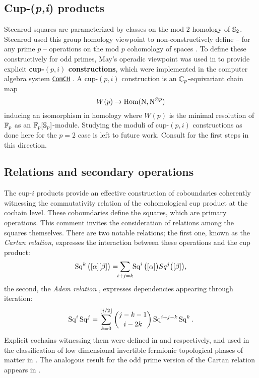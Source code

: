 \subsection{Cup-(\textit{p,i}) products}

Steenrod squares are parameterized by classes on the mod $2$ homology of $\mathbb{S}_2$.
Steenrod used this group homology viewpoint to non-constructively define -- for any prime $p$ -- operations on the mod $p$ cohomology of spaces \cite{steenrod1952reduced, steenrod1953cyclic}.
To define these constructively for odd primes, May's operadic viewpoint \cite{may1970general} was used in \cite{medina2021may_st} to provide explicit \textbf{cup-$(p,i)$ constructions}, which were implemented in the computer algebra system \href{https://github.com/ammedmar/comch}{\texttt{ComCH}} \cite{medina2021comch}.
A \mbox{cup-$(p,i)$} construction is an $\mathbb{C}_p$-equivariant chain map
\[
W(p) \to \mathrm{Hom}(\operatorname{N}, \operatorname{N}^{\otimes p})
\]
inducing an isomorphism in homology where $W(p)$
is the minimal resolution of ${\mathbb{F}_p}$ as an ${\mathbb{F}_p}[\mathbb{S}_p]$-module.
Studying the moduli of cup-$(p,i)$ constructions as done here for the $p = 2$ case is left to future work.
Consult \cite{medina2024connected} for the first steps in this direction.

\subsection{Relations and secondary operations}

The cup-$i$ products provide an effective construction of coboundaries coherently witnessing the commutativity relation of the cohomological cup product at the cochain level.
These coboundaries define the squares, which are primary operations.
This comment invites the consideration of relations among the squares themselves.
There are two notable relations;
the first one, known as the \textit{Cartan relation}, expresses the interaction between these operations and the cup product:
\begin{equation*}
	\Sq^k \big( [\alpha] [\beta] \big) =
	\sum_{\mathclap{i+j=k}} \, \Sq^i\big([\alpha]\big) Sq^j\big([\beta]\big),
\end{equation*}
the second, the \textit{Adem relation} \cite{adem1952iteration}, expresses dependencies appearing through iteration:
\begin{equation*}
	\operatorname{Sq}^i \operatorname{Sq}^j =
	\sum_{k=0}^{\lfloor i/2 \rfloor} \binom{j-k-1}{i-2k} \operatorname{Sq}^{i+j-k} \operatorname{Sq}^k.
\end{equation*}
Explicit cochains witnessing them were defined in \cite{medina2020cartan} and \cite{medina2021adem} respectively, and used in the classification of low dimensional invertible fermionic topological phases of matter in \cite{kapustin2017fermionic, barkeshli2021classification}.
The analogous result for the odd prime version of the Cartan relation appears in \cite{medina2023oddcartan}.

